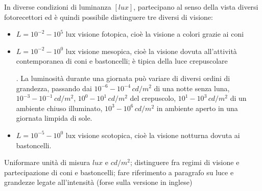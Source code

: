 \documentclass[letterpaper,10pt,italian]{jupyterBook}
\begin{document}
\sphinxAtStartPar
In diverse condizioni di luminanza \([lux]\), partecipano al senso della vista diversi fotorecettori ed è quindi possibile distinguere tre diversi di visione:
\begin{itemize}
\item {} 
\sphinxAtStartPar
\(L = 10^{-2} - 10^{5} \text{ lux}\) visione fotopica, cioè la visione a colori grazie ai coni

\item {} 
\sphinxAtStartPar
\(L = 10^{-2} - 10^{0} \text{ lux}\) visione mesopica, cioè la visione dovuta all’attività contemporanea di coni e bastoncelli; è tipica della luce crepuscolare%
\begin{footnote}[2]\sphinxAtStartFootnote
{}. La luminosità durante una giornata può variare di diversi ordini di grandezza, passando dai \(10^{-6}-10^{-4} \, cd/m^2\) di una notte senza luna, \(10^{-3}-10^{-1} \, cd/m^2\), \(10^{0}-10^{1} \, cd/m^2\) del crepuscolo, \(10^{1}-10^{3} \, cd/m^2\) di un ambiente chiuso illuminato, \(10^{3}-10^{6} \, cd/m^2\) in ambiente aperto in una giornata limpida di sole.
%
\end{footnote}

\item {} 
\sphinxAtStartPar
\(L = 10^{-5} - 10^{0} \text{ lux}\) visione scotopica, cioè la visione notturna dovuta ai bastoncelli.

\end{itemize}

\sphinxAtStartPar
{} Uniformare unità di misura \(lux\) e \(cd/m^2\); distinguere fra regimi di visione e partecipazione di coni e bastoncelli; fare riferimento a paragrafo su luce e grandezze legate all’intensità (forse sulla versione in inglese)
\end{document}
